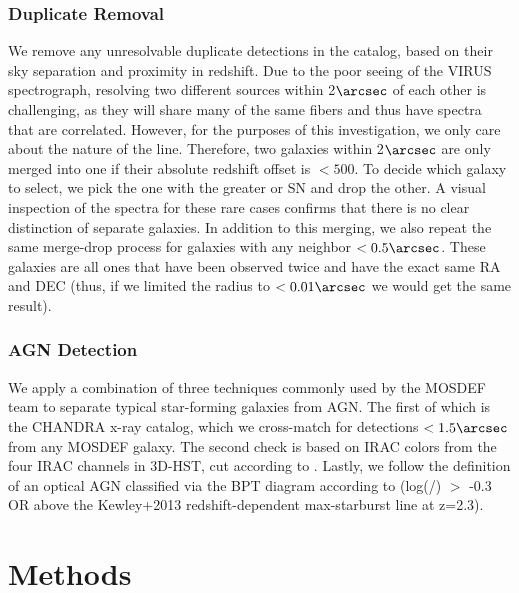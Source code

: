 \documentclass[linenumbers,amsmath,trackchanges,preprint2]{aastex702}
\begin{document}
\subsubsection{Duplicate Removal}
\par We remove any unresolvable duplicate detections in the catalog, based on their sky separation and proximity in redshift. Due to the poor seeing of the VIRUS spectrograph, resolving two different sources within 2$\arcsec$ of each other is challenging, as they will share many of the same fibers and thus have spectra that are correlated. However, for the purposes of this investigation, we only care about the nature of the \lya line. Therefore, two galaxies within 2$\arcsec$ are only merged into one if their absolute redshift offset is $<500$\kms. To decide which galaxy to select, we pick the one with the greater \Ha or \OIII SN and drop the other. A visual inspection of the spectra for these rare cases confirms that there is no clear distinction of separate galaxies. In addition to this merging, we also repeat the same merge-drop process for galaxies with any neighbor $<0.5\arcsec$. These galaxies are all ones that have been observed twice and have the exact same RA and DEC (thus, if we limited the radius to $<0.01\arcsec$ we would get the same result).
\subsubsection{AGN Detection}
\par We apply a combination of three techniques commonly used by the MOSDEF team to separate typical star-forming galaxies from AGN. The first of which is the CHANDRA x-ray catalog, which we cross-match for detections $<1.5\arcsec$ from any MOSDEF galaxy. The second check is based on IRAC colors from the four IRAC channels in 3D-HST, cut according to \cite{donley2012}. Lastly, we follow the definition of an optical AGN classified via the BPT diagram according to \cite{melendez2014} (log(\NII/\Ha) $>$ -0.3 OR above the Kewley+2013 redshift-dependent max-starburst line at z=2.3).


\section{Methods}
\end{document}
